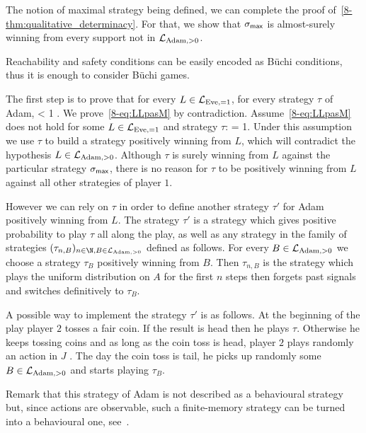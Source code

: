 \medskip 

The notion of maximal strategy being defined,
we can complete the proof of~\cref{8-thm:qualitative_determinacy}.
For that, we show that
$\sigma_{\textsf{max}}$
is almost-surely
winning from every support not in $\mathcal{L}_{\text{Adam},>0}$.



Reachability and safety conditions can be easily encoded as B{\"u}chi conditions,
thus it is enough to consider  B{\"u}chi games.



The first step is to prove that for every $L\in\mathcal{L}_{\text{Eve},=1}$,
for every strategy $\tau$ of Adam,
\be\label{eq:LLpasM}
 < 1 \enspace.
\ee
We prove~\cref{8-eq:LLpasM} by contradiction.
Assume~\cref{8-eq:LLpasM} does not hold for some $L\in \mathcal{L}_{\text{Eve},=1}$
and strategy $\tau$:
\be\label{eq:winsafe}
 = 1\enspace.
\ee
Under this assumption we use $\tau$ to build a strategy positively winning from $L$,
which will contradict the hypothesis 
$L\in\mathcal{L}_{\text{Adam},>0}$.
Although $\tau$ is surely winning from $L$ against the particular strategy $\sigma_{\textsf{max}}$,
there is no reason for $\tau$ to be positively winning from $L$
against all other strategies of player $1$.
{
However we can rely on $\tau$
in order to define another strategy 
$\tau'$ for Adam positively winning from $L$.
The strategy $\tau'$ is a strategy
which gives positive probability to play $\tau$
all along the play,
as well as any strategy in the family
of strategies
$(\tau_{n,B})_{n\in\N,B\in \LLA}$ defined as follows.
For every $B\in\mathcal{L}_{\text{Adam},>0}$ we choose a strategy $\tau_B$ positively winning from $B$.
Then
$\tau_{n,B}$ is the strategy which plays 
the uniform distribution on $A$ for the first $n$ steps then forgets past signals and switches definitively to $\tau_B$. 

A possible way to implement the  strategy $\tau'$
is as follows.
At the beginning of the play
player $2$ tosses a fair coin. If the result is head then he plays $\tau$. Otherwise he keeps 
tossing coins and as long as the coin toss is head, player $2$ plays randomly an action in $J$ .
The day the coin toss is tail, he picks up randomly some $B\in\mathcal{L}_{\text{Adam},>0}$ and starts playing $\tau_B$.
}
Remark that this strategy of Adam is not described as a behavioural strategy
but, since actions are observable,
such a finite-memory strategy can be turned into a behavioural one,
see~\cite[Lemma 4.6 and 4.7]{BGGjacm}.



